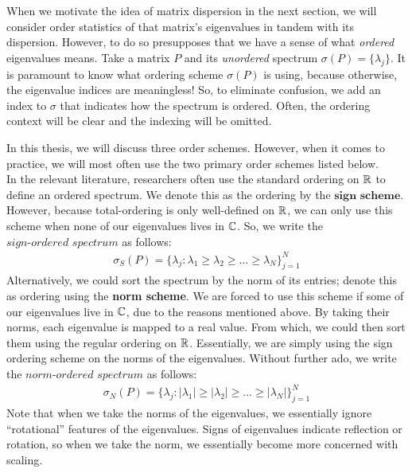 When we motivate the idea of matrix dispersion in the next section, we will consider order statistics of that matrix's eigenvalues in tandem with its dispersion.
However, to do so presupposes that we have a sense of what \textit{ordered} eigenvalues means.
Take a matrix $P$ and its \textit{unordered} spectrum $\sigma(P) = \{\lambda_j\}$.
It is paramount to know what ordering scheme $\sigma(P)$ is using, because otherwise, the eigenvalue indices are meaningless!
So, to eliminate confusion, we add an index to $\sigma$ that indicates how the spectrum is ordered.
Often, the ordering context will be clear and the indexing will be omitted.



In this thesis, we will discuss three order schemes. However, when it comes to practice, we will most often use the two primary order schemes listed below. \\

In the relevant literature, researchers often use the standard ordering on $\mathbb{R}$ to define an ordered spectrum.
We denote this as the ordering by the $\textbf{sign scheme}$.
However, because total-ordering is only well-defined on $\mathbb{R}$, we can only use this scheme when none of our eigenvalues lives in $\mathbb{C}$.
So, we write the $\textit{sign-ordered spectrum}$ as follows:
\begin{align*}
\sigma_S(P) = \{\lambda_j : \lambda_1 \geq \lambda_2 \geq \dots \geq \lambda_N\}_{j = 1}^N
\end{align*}
Alternatively, we could sort the spectrum by the norm of its entries; denote this as ordering using the \textbf{norm scheme}.
We are forced to use this scheme if some of our eigenvalues live in $\mathbb{C}$, due to the reasons mentioned above.
By taking their norms, each eigenvalue is mapped to a real value. From which, we could then sort them using the regular ordering on $\mathbb{R}$.
Essentially, we are simply using the sign ordering scheme on the norms of the eigenvalues.
Without further ado, we write the $\textit{norm-ordered spectrum}$ as follows:
\begin{align*}
\sigma_N(P) = \{\lambda_j : |\lambda_1| \geq |\lambda_2| \geq \dots \geq |\lambda_N|\}_{j = 1}^N
\end{align*}
Note that when we take the norms of the eigenvalues, we essentially ignore ``rotational'' features of the eigenvalues.
Signs of eigenvalues indicate reflection or rotation, so when we take the norm, we essentially become more concerned with scaling. \\


